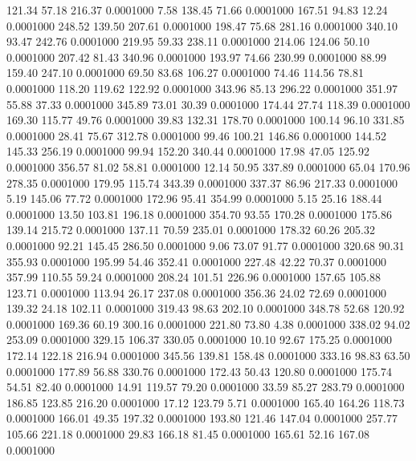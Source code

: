  121.34   57.18  216.37   0.0001000
   7.58  138.45   71.66   0.0001000
 167.51   94.83   12.24   0.0001000
 248.52  139.50  207.61   0.0001000
 198.47   75.68  281.16   0.0001000
 340.10   93.47  242.76   0.0001000
 219.95   59.33  238.11   0.0001000
 214.06  124.06   50.10   0.0001000
 207.42   81.43  340.96   0.0001000
 193.97   74.66  230.99   0.0001000
  88.99  159.40  247.10   0.0001000
  69.50   83.68  106.27   0.0001000
  74.46  114.56   78.81   0.0001000
 118.20  119.62  122.92   0.0001000
 343.96   85.13  296.22   0.0001000
 351.97   55.88   37.33   0.0001000
 345.89   73.01   30.39   0.0001000
 174.44   27.74  118.39   0.0001000
 169.30  115.77   49.76   0.0001000
  39.83  132.31  178.70   0.0001000
 100.14   96.10  331.85   0.0001000
  28.41   75.67  312.78   0.0001000
  99.46  100.21  146.86   0.0001000
 144.52  145.33  256.19   0.0001000
  99.94  152.20  340.44   0.0001000
  17.98   47.05  125.92   0.0001000
 356.57   81.02   58.81   0.0001000
  12.14   50.95  337.89   0.0001000
  65.04  170.96  278.35   0.0001000
 179.95  115.74  343.39   0.0001000
 337.37   86.96  217.33   0.0001000
   5.19  145.06   77.72   0.0001000
 172.96   95.41  354.99   0.0001000
   5.15   25.16  188.44   0.0001000
  13.50  103.81  196.18   0.0001000
 354.70   93.55  170.28   0.0001000
 175.86  139.14  215.72   0.0001000
 137.11   70.59  235.01   0.0001000
 178.32   60.26  205.32   0.0001000
  92.21  145.45  286.50   0.0001000
   9.06   73.07   91.77   0.0001000
 320.68   90.31  355.93   0.0001000
 195.99   54.46  352.41   0.0001000
 227.48   42.22   70.37   0.0001000
 357.99  110.55   59.24   0.0001000
 208.24  101.51  226.96   0.0001000
 157.65  105.88  123.71   0.0001000
 113.94   26.17  237.08   0.0001000
 356.36   24.02   72.69   0.0001000
 139.32   24.18  102.11   0.0001000
 319.43   98.63  202.10   0.0001000
 348.78   52.68  120.92   0.0001000
 169.36   60.19  300.16   0.0001000
 221.80   73.80    4.38   0.0001000
 338.02   94.02  253.09   0.0001000
 329.15  106.37  330.05   0.0001000
  10.10   92.67  175.25   0.0001000
 172.14  122.18  216.94   0.0001000
 345.56  139.81  158.48   0.0001000
 333.16   98.83   63.50   0.0001000
 177.89   56.88  330.76   0.0001000
 172.43   50.43  120.80   0.0001000
 175.74   54.51   82.40   0.0001000
  14.91  119.57   79.20   0.0001000
  33.59   85.27  283.79   0.0001000
 186.85  123.85  216.20   0.0001000
  17.12  123.79    5.71   0.0001000
 165.40  164.26  118.73   0.0001000
 166.01   49.35  197.32   0.0001000
 193.80  121.46  147.04   0.0001000
 257.77  105.66  221.18   0.0001000
  29.83  166.18   81.45   0.0001000
 165.61   52.16  167.08   0.0001000
